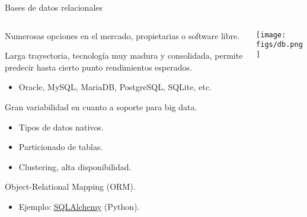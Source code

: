 \begin{frame}{Bases de datos relacionales}
 \begin{columns}[T]
    \begin{column}{.8\textwidth}
    \begin{wideitemize}
    \item Numerosas opciones en el mercado, propietarias o software libre.
    \item Larga trayectoria, tecnología muy madura y consolidada, permite predecir
    hasta cierto punto rendimientos esperados.
    \begin{itemize}
    \item Oracle, MySQL, MariaDB, PostgreSQL, SQLite, etc.
    \end{itemize}
    \item Gran variabilidad en cuanto a soporte para big data.
    \begin{itemize}
    \item Tipos de datos nativos.
    \item Particionado de tablas.
    \item Clustering, alta disponibilidad.
    \end{itemize}

    \item Object-Relational Mapping (ORM).
    \begin{itemize}
    \item Ejemplo: \href{http://www.sqlalchemy.org/}{SQLAlchemy} (Python).
    \end{itemize}

  \end{wideitemize}
    \end{column}
    \begin{column}{.2\textwidth}
    \vspace*{1.5cm}
    \texttt{[image: figs/db.png]}
    \end{column}
  \end{columns}

\end{frame}


